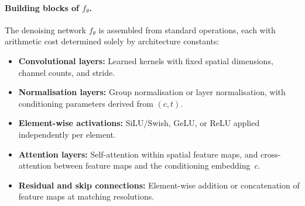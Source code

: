 \documentclass[11pt]{article}
\begin{document}
\paragraph{Building blocks of $f_\theta$.}
The denoising network $f_\theta$ is assembled from standard operations, each with arithmetic cost determined solely by architecture constants:
\begin{itemize}[nosep]
    \item \textbf{Convolutional layers:} Learned kernels with fixed spatial dimensions, channel counts, and stride.
    \item \textbf{Normalisation layers:} Group normalisation or layer normalisation, with conditioning parameters derived from $(c, t)$.
    \item \textbf{Element-wise activations:} SiLU/Swish, GeLU, or ReLU applied independently per element.
    \item \textbf{Attention layers:} Self-attention within spatial feature maps, and cross-attention between feature maps and the conditioning embedding~$c$.
    \item \textbf{Residual and skip connections:} Element-wise addition or concatenation of feature maps at matching resolutions.
\end{itemize}
\end{document}
